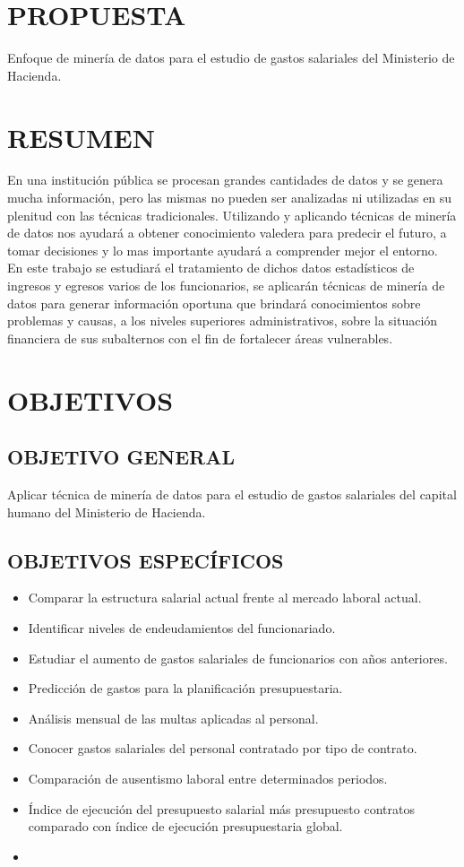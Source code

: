 \section{PROPUESTA}
Enfoque de minería de datos para el estudio de gastos salariales del Ministerio de Hacienda.

\section*{RESUMEN}
En una institución pública se procesan grandes cantidades de datos y se genera mucha información, pero las mismas no pueden ser analizadas ni utilizadas en su plenitud con las técnicas tradicionales. Utilizando y aplicando técnicas de minería de datos nos ayudará a obtener conocimiento valedera para predecir el futuro, a tomar decisiones y lo mas importante ayudará a comprender mejor el entorno.\\

En este trabajo se estudiará el tratamiento de dichos datos estadísticos de ingresos y egresos varios de los funcionarios, se aplicarán técnicas de minería de datos para generar información oportuna que brindará conocimientos sobre problemas y causas, a los niveles superiores administrativos, sobre la situación financiera de sus subalternos con el fin de fortalecer áreas vulnerables.\\

\section{OBJETIVOS}
\subsection{OBJETIVO GENERAL}
Aplicar técnica de minería de datos para el estudio de gastos salariales del capital humano del Ministerio de Hacienda.
\subsection{OBJETIVOS ESPECÍFICOS}
\begin{itemize}
	\item
	Comparar la estructura salarial actual frente al mercado laboral actual.
	\item
	Identificar niveles de endeudamientos del funcionariado.
	\item
	Estudiar el aumento de gastos salariales de funcionarios con años anteriores.
	\item
	Predicción de gastos para la planificación presupuestaria.
	\item
	Análisis mensual de las multas aplicadas al personal.
	\item
	Conocer gastos salariales del personal contratado por tipo de contrato.
	\item
	Comparación de ausentismo laboral entre determinados periodos.
	\item
	Índice de ejecución del presupuesto salarial más presupuesto contratos comparado con índice de ejecución presupuestaria global.
	\item
	
\end{itemize}

